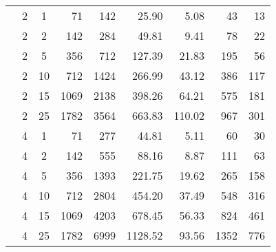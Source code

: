 \documentclass[12pt,a4paper]{article}
\begin{document}
\begin{table}
\begin{center}
\begin{tabular}{cccrrrrrr}
&  2 & 1 &  71 & 142  & 25.90 & 5.08 &  43 &  13 \\
&  2 & 2 & 142 & 284  & 49.81 & 9.41 &  78 &  22 \\ 
&  2 & 5 & 356 & 712  & 127.39 & 21.83 & 195 &  56 \\
& 2 & 10 & 712 & 1424  & 266.99 & 43.12 & 386 & 117 \\ 
&  2 & 15 & 1069 & 2138  & 398.26 & 64.21 & 575 & 181 \\ 
&  2 & 25 & 1782 & 3564  & 663.83 & 110.02 & 967 & 301 \\  \rowcolor[gray]{0.85}
\cellcolor{white}&  4 & 1 &  71 & 277  & 44.81 & 5.11 &  60 &  30 \\ \rowcolor[gray]{0.85}
\cellcolor{white}&  4 & 2 & 142 & 555  & 88.16 & 8.87 & 111 &  63 \\ \rowcolor[gray]{0.85}
\cellcolor{white}&  4 & 5 & 356 & 1393  & 221.75 & 19.62 & 265 & 158 \\\rowcolor[gray]{0.85}
\cellcolor{white}&  4 & 10 & 712 & 2804  & 454.20 & 37.49 & 548 & 316 \\ \rowcolor[gray]{0.85}
\cellcolor{white}&  4 & 15 & 1069 & 4203  & 678.45 & 56.33 & 824 & 461 \\ \rowcolor[gray]{0.85}
\cellcolor{white}\multirow{-12}{*}{\begin{sideways}\textbf{\large equal width}\end{sideways}} 
&  4 & 25 & 1782 & 6999  & 1128.52 & 93.56 & 1352 & 776 \\  \hline
\end{tabular}
\end{center}
\end{table}
\end{document}
